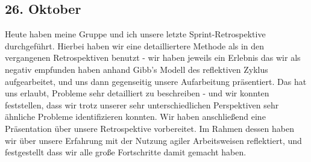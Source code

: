 \subsection{26. Oktober}
Heute haben meine Gruppe und ich unsere letzte Sprint-Retrospektive durchgeführt. Hierbei haben wir eine detailliertere Methode als in den vergangenen Retrospektiven benutzt - wir haben jeweils ein Erlebnis das wir als negativ empfunden haben anhand Gibb's Modell des reflektiven Zyklus aufgearbeitet, und uns dann gegenseitig unsere Aufarbeitung präsentiert. Das hat uns erlaubt, Probleme sehr detailliert zu beschreiben - und wir konnten feststellen, dass wir trotz unserer sehr unterschiedlichen Perspektiven sehr ähnliche Probleme identifizieren konnten. Wir haben anschließend eine Präsentation über unsere Retrospektive vorbereitet. Im Rahmen dessen haben wir über unsere Erfahrung mit der Nutzung agiler Arbeitsweisen reflektiert, und festgestellt dass wir alle große Fortschritte damit gemacht haben.
